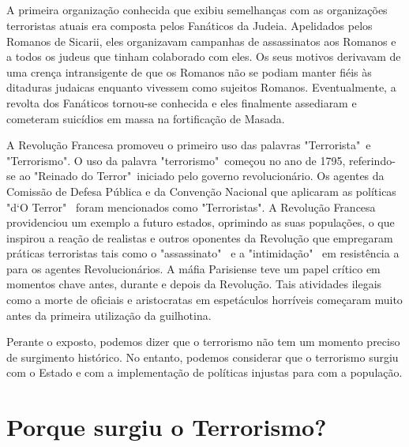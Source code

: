 \documentclass{report}
\begin{document}
\paragraph{} A primeira organização conhecida que exibiu semelhanças com as organizações terroristas atuais era composta pelos Fanáticos da Judeia. Apelidados pelos Romanos de Sicarii, eles organizavam campanhas de assassinatos aos Romanos e a todos os judeus que tinham colaborado com eles. Os seus motivos derivavam de uma crença intransigente de que os Romanos não se podiam manter fiéis às ditaduras judaicas enquanto vivessem como sujeitos Romanos. Eventualmente, a revolta dos Fanáticos tornou-se conhecida e eles finalmente assediaram e cometeram suicídios em massa na fortificação de Masada.\par
A Revolução Francesa promoveu o primeiro uso das palavras "Terrorista"\, e "Terrorismo". O uso da palavra "terrorismo"\, começou no ano de 1795, referindo-se ao "Reinado do Terror"\, iniciado pelo governo revolucionário. Os agentes da Comissão de Defesa Pública e da Convenção Nacional que aplicaram as políticas "d`O Terror" \, foram mencionados como "Terroristas". A Revolução Francesa providenciou um exemplo a futuro estados, oprimindo as suas populações, o que inspirou a reação de realistas e outros oponentes da Revolução que empregaram práticas terroristas tais como o "assassinato" \, e a "intimidação" \, em resistência a para os agentes Revolucionários. A máfia Parisiense teve um papel crítico em momentos chave antes, durante e depois da Revolução. Tais atividades ilegais como a morte de oficiais e aristocratas em espetáculos horríveis começaram muito antes da primeira utilização da guilhotina.\par
Perante o exposto, podemos dizer que o terrorismo não tem um momento preciso de surgimento histórico. No entanto, podemos considerar que o terrorismo surgiu com o Estado e com a implementação de políticas injustas para com a população. 



\chapter{Porque surgiu o Terrorismo?}
\label{chap.Porque surgiu o Terrorismo?}
\end{document}

